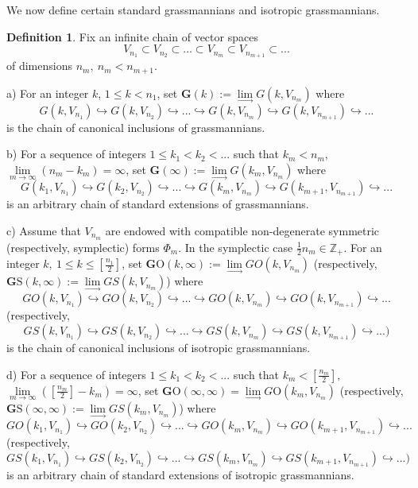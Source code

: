 \documentclass[12pt]{amsart}
\theoremstyle{definition}
\newtheorem{definition}[theorem]{Definition}
\begin{document}
We now define certain standard grassmannians and isotropic grassmannians.

\begin{definition}\label{G(k)}
Fix an infinite chain of vector spaces
$$
V_{n_1}\subset V_{n_2}\subset...\subset V_{n_m}\subset V_{n_{m+1}}\subset...
$$
of dimensions $n_m,\ n_m< n_{m+1}$.

a) For an integer $k$, $1\le k< n_1$, set $\mathbf{G}(k):=\underset{\to}\lim G(k,V_{n_m})$ where
$$
G(k,V_{n_1})\hookrightarrow G(k,V_{n_2})\hookrightarrow...\hookrightarrow G(k,V_{n_m})\hookrightarrow
G(k,V_{n_{m+1}})\hookrightarrow...
$$
is the chain of canonical inclusions of grassmannians.

b) For a sequence of integers $1\le k_1< k_2<...$ such that $ k_m< n_m,$  $\underset{m\to\infty}\lim(n_m-k_m)=\infty$,
set
$\mathbf{G}(\infty):=\underset{\to}\lim G(k_m,V_{n_m})$ where
$$
G(k_1,V_{n_1})\hookrightarrow G(k_2,V_{n_2})\hookrightarrow...\hookrightarrow G(k_m,V_{n_m})\hookrightarrow
G(k_{m+1},V_{n_{m+1}})\hookrightarrow...
$$
is an arbitrary chain of standard extensions of grassmannians.

c) Assume that $V_{n_m}$ are endowed with compatible non-degenerate symmetric (respectively, symplectic) forms $\Phi_m$.
In the symplectic case $\frac{1}{2}n_m\in\mathbb{Z}_+$.
For an integer $k,\ 1\le k\le[\frac{n_1}{2}]$, set
 $\mathbf{G}\mathrm{O}(k,\infty):=\underset{\to}\lim GO(k,V_{n_m})$ (respectively,
 $\mathbf{G}\mathrm{S}(k,\infty):=\underset{\to}\lim GS(k,V_{n_m})$) where
$$
GO(k,V_{n_1})\hookrightarrow GO(k,V_{n_2})\hookrightarrow...\hookrightarrow GO(k,V_{n_m})\hookrightarrow
GO(k,V_{n_{m+1}})\hookrightarrow...
$$
(respectively,
$$
GS(k,V_{n_1})\hookrightarrow GS(k,V_{n_2})\hookrightarrow...\hookrightarrow GS(k,V_{n_m})\hookrightarrow
GS(k,V_{n_{m+1}})\hookrightarrow...)
$$
is the chain of canonical inclusions of isotropic grassmannians.

d) For a sequence of integers $1\le k_1< k_2<...$ such that $k_m<[\frac{n_m}{2}],$
$\underset{m\to\infty}\lim([\frac{n_m}{2}]-k_m)=\infty$,
set $\mathbf{G}\mathrm{O}(\infty,\infty)=\underset{\to}\lim G\mathrm{O}(k_m,V_{n_m})$
(respectively, $\mathbf{G}\mathrm{S}(\infty,\infty):=\underset{\to}\lim GS(k_m,V_{n_m})$)
where
\begin{equation}\label{chain O}
GO(k_1,V_{n_1})\hookrightarrow GO(k_2,V_{n_2})\hookrightarrow...\hookrightarrow GO(k_m,V_{n_m})\hookrightarrow
GO(k_{m+1},V_{n_{m+1}})\hookrightarrow...
\end{equation}
(respectively,
\begin{equation}\label{chain S}
GS(k_1,V_{n_1})\hookrightarrow GS(k_2,V_{n_2})\hookrightarrow...\hookrightarrow GS(k_m,V_{n_m})\hookrightarrow
GS(k_{m+1},V_{n_{m+1}})\hookrightarrow...)
\end{equation}
is an arbitrary chain of standard extensions of isotropic grassmannians.


\end{definition}
\end{document}
